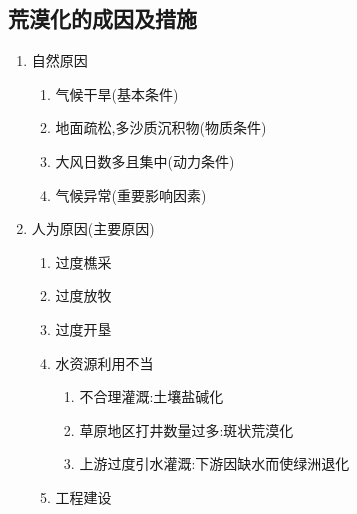 \documentclass[a4paper]{article}
\begin{document}
    \subsection{荒漠化的成因及措施}
    \begin{enumerate}
        \item 自然原因
        \begin{enumerate}
            \item 气候干旱(基本条件)
            \item 地面疏松,多沙质沉积物(物质条件)
            \item 大风日数多且集中(动力条件)
            \item 气候异常(重要影响因素)
        \end{enumerate}
        \item 人为原因(主要原因)
        \begin{enumerate}
            \item 过度樵采
            \item 过度放牧
            \item 过度开垦
            \item 水资源利用不当
            \begin{enumerate}
                \item 不合理灌溉:土壤盐碱化
                \item 草原地区打井数量过多:斑状荒漠化
                \item 上游过度引水灌溉:下游因缺水而使绿洲退化
            \end{enumerate}
            \item 工程建设
        \end{enumerate}
    \end{enumerate}
\end{document}
